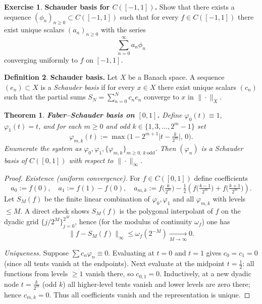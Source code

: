 \documentclass[11pt,a4paper]{article}
\newtheorem{theorem}{Theorem}
\theoremstyle{definition}
\newtheorem{exercise}{Exercise} %
\theoremstyle{definition}
\newtheorem{definition}[exercise]{Definition}
\theoremstyle{plain}
\theoremstyle{remark}
\begin{document}
\clearpage


\begin{exercise}
	\textbf{Schauder basis for $C([-1,1])$.}
	Show that there exists a sequence $(\phi_n)_{n\ge 0}\subset C([-1,1])$ such that for every
	$f\in C([-1,1])$ there exist unique scalars $(a_n)_{n\ge 0}$ with the series
	\[
	\sum_{n=0}^\infty a_n \phi_n
	\]
	converging uniformly to $f$ on $[-1,1]$.
\end{exercise}

\begin{definition}
	\textbf{Schauder basis.}
	Let $X$ be a Banach space. A sequence $(e_n)\subset X$ is a \emph{Schauder basis} if
	for every $x\in X$ there exist unique scalars $(c_n)$ such that the partial sums
	$S_N=\sum_{n=0}^N c_n e_n$ converge to $x$ in $\|\cdot\|_X$.
\end{definition}

\begin{theorem}
	\textbf{Faber--Schauder basis on $[0,1]$.}
	Define $\varphi_0(t)\equiv 1$, $\varphi_1(t)=t$, and for each $m\ge0$ and odd
	$k\in\{1,3,\dots,2^m-1\}$ set
	\[
	\varphi_{m,k}(t):=\max\!\Big(1-2^{m+1}\big|t-\tfrac{k}{2^m}\big|,\,0\Big).
	\]
	Enumerate the system as $\varphi_0,\varphi_1,\{\varphi_{m,k}\}_{m\ge0,\ k\ \mathrm{odd}}$.
	Then $(\varphi_n)$ is a Schauder basis of $C([0,1])$ with respect to $\|\cdot\|_\infty$.
\end{theorem}

\begin{proof}
	\emph{Existence (uniform convergence).}
	For $f\in C([0,1])$ define coefficients
	\[
	a_0:=f(0),\quad a_1:=f(1)-f(0),\quad
	a_{m,k}:=f\!\Big(\tfrac{k}{2^m}\Big)-\tfrac12\!\left(
	f\!\Big(\tfrac{k-1}{2^m}\Big)+f\!\Big(\tfrac{k+1}{2^m}\Big)\right).
	\]
	Let $S_M(f)$ be the finite linear combination of $\varphi_0,\varphi_1$ and all
	$\varphi_{m,k}$ with levels $\le M$. A direct check shows $S_M(f)$ is the
	polygonal interpolant of $f$ on the dyadic grid $\{j/2^M\}_{j=0}^{2^M}$, hence
	(for the modulus of continuity $\omega_f$) one has
	\[
	\|f-S_M(f)\|_\infty \le \omega_f(2^{-M}) \xrightarrow[M\to\infty]{} 0.
	\]
	
	\emph{Uniqueness.}
	Suppose $\sum c_n\varphi_n\equiv 0$. Evaluating at $t=0$ and $t=1$ gives $c_0=c_1=0$
	(since all tents vanish at the endpoints). Next evaluate at the midpoint $t=\tfrac12$:
	all functions from levels $\ge1$ vanish there, so $c_{0,1}=0$. Inductively, at a new
	dyadic node $t=\tfrac{k}{2^m}$ (odd $k$) all higher-level tents vanish and lower levels
	are zero there; hence $c_{m,k}=0$. Thus all coefficients vanish and the representation is unique.
\end{proof}
\end{document}
